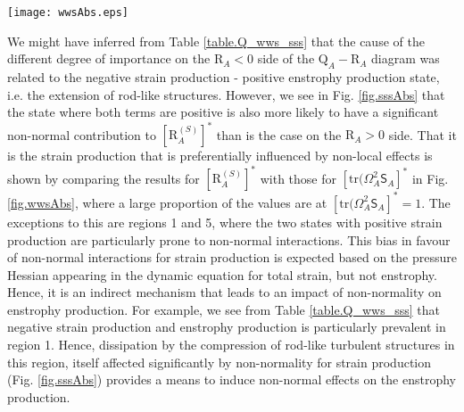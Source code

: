 \documentclass[preprint,amssymb,amsmath,aip,cha]{revtex4-1}
\begin{document}
\begin{figure*}
  \texttt{[image: wwsAbs.eps]}
\caption{Probability curves for $[\mbox{tr}(\mathsf{\Omega}^{2}_{A}\mathsf{S}_{A}]^{*}$ as a function of the six regions of the $Q_{A}-R_{A}$ diagram and the four possible states of the strain production and enstrophy production for $\mathsf{A}$ and truncated just inside the limits of $[\mbox{tr}(\mathsf{\Omega}^{2}\mathsf{S}_{A}]^{*} = \pm 1$. Results are normalized such that the integrated probability in each of the panels is unity. The left hand values in each panel are the probabilities for $[\mbox{tr}(\mathsf{\Omega}^{2}_{A}\mathsf{S}_{A}]^{*} = -1$ with grey for the $R^{(S)}_{A} < 0$, $\mbox{tr}(\mathsf{\Omega}^{2}_{A}\mathsf{S}_{A}) < 0$ curve and black for the $R^{(S)}_{A} > 0$, $\mbox{tr}(\mathsf{\Omega}^{2}_{A}\mathsf{S}_{A}) < 0$ curve. The right hand values in each panel are the probabilities for $[\mbox{tr}(\mathsf{\Omega}^{2}_{A}\mathsf{S}_{A}]^{*} = +1$ with grey for the $R^{(S)}_{A} < 0$, $\mbox{tr}(\mathsf{\Omega}^{2}_{A}\mathsf{S}_{A}) > 0$ curve and black for the $R^{(S)}_{A} > 0$, $\mbox{tr}(\mathsf{\Omega}^{2}_{A}\mathsf{S}_{A}) > 0$ curve.}
\label{fig.wwsAbs}       %
\end{figure*}

We might have inferred from Table \ref{table.Q_wws_sss} that the cause of the different degree of importance on the $\mbox{R}_{A} < 0$ side of the $\mbox{Q}_{A} - \mbox{R}_{A}$ diagram was related to the negative strain production - positive enstrophy production state, i.e. the extension of rod-like structures. However, we see in Fig. \ref{fig.sssAbs} that the state where both terms are positive is also more likely to have a significant non-normal contribution to $[\mbox{R}^{(S)}_{A}]^{*}$ than is the case on the $\mbox{R}_{A} > 0$ side. That it is the strain production that is preferentially influenced by non-local effects is shown by comparing the results for  $[\mbox{R}^{(S)}_{A}]^{*}$ with those for  $[\mbox{tr}(\mathsf{\Omega}^{2}_{A}\mathsf{S}_{A}]^{*}$ in Fig. \ref{fig.wwsAbs}, where a large proportion of the values are at $[\mbox{tr}(\mathsf{\Omega}^{2}_{A}\mathsf{S}_{A}]^{*} = 1$. The exceptions to this are regions 1 and 5, where the two states with positive strain production are particularly prone to non-normal interactions. This bias in favour of non-normal interactions for strain production is expected based on the pressure Hessian appearing in the dynamic equation for total strain, but not enstrophy. Hence, it is an indirect mechanism that leads to an impact of non-normality on enstrophy production. For example, we see from Table \ref{table.Q_wws_sss} that negative strain production and enstrophy production is particularly prevalent in region 1. Hence, dissipation by the compression of rod-like turbulent structures \citep{tsinober01} in this region, itself affected significantly by non-normality for strain production (Fig. \ref{fig.sssAbs}) provides a means to induce non-normal effects on the enstrophy production.
\end{document}
